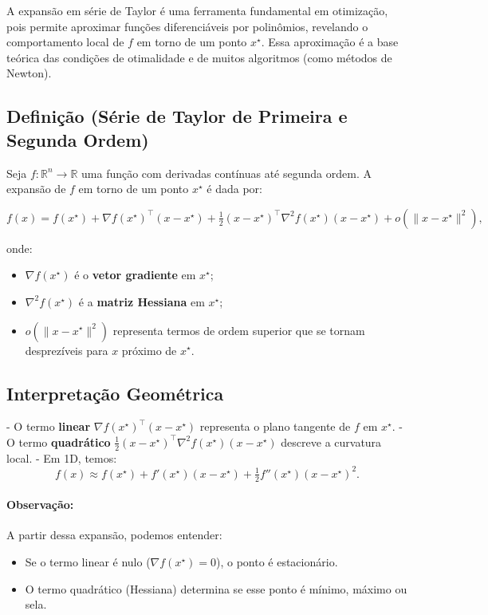 \documentclass[9pt,a4paper]{extarticle}
\begin{document}
A expansão em série de Taylor é uma ferramenta fundamental em otimização, pois permite aproximar funções diferenciáveis por polinômios, revelando o comportamento local de $f$ em torno de um ponto $x^\star$. Essa aproximação é a base teórica das condições de otimalidade e de muitos algoritmos (como métodos de Newton).

\subsection*{Definição (Série de Taylor de Primeira e Segunda Ordem)}

Seja $f:\mathbb{R}^n \to \mathbb{R}$ uma função com derivadas contínuas até segunda ordem.  
A expansão de $f$ em torno de um ponto $x^\star$ é dada por:

\[
f(x) = f(x^\star) 
+ \nabla f(x^\star)^\top (x - x^\star)
+ \tfrac{1}{2}(x - x^\star)^\top \nabla^2 f(x^\star) (x - x^\star)
+ o(\|x - x^\star\|^2),
\]

onde:
\begin{itemize}
    \item $\nabla f(x^\star)$ é o \textbf{vetor gradiente} em $x^\star$;
    \item $\nabla^2 f(x^\star)$ é a \textbf{matriz Hessiana} em $x^\star$;
    \item $o(\|x - x^\star\|^2)$ representa termos de ordem superior que se tornam desprezíveis para $x$ próximo de $x^\star$.
\end{itemize}

\subsection*{Interpretação Geométrica}

- O termo \textbf{linear} $\nabla f(x^\star)^\top (x - x^\star)$ representa o plano tangente de $f$ em $x^\star$.  
- O termo \textbf{quadrático} $\tfrac{1}{2}(x - x^\star)^\top \nabla^2 f(x^\star)(x - x^\star)$ descreve a curvatura local.  
- Em 1D, temos:
  \[
  f(x) \approx f(x^\star) + f'(x^\star)(x - x^\star) + \tfrac{1}{2}f''(x^\star)(x - x^\star)^2.
  \]

\paragraph{Observação:}
A partir dessa expansão, podemos entender:
\begin{itemize}
    \item Se o termo linear é nulo ($\nabla f(x^\star)=0$), o ponto é estacionário.
    \item O termo quadrático (Hessiana) determina se esse ponto é mínimo, máximo ou sela.
\end{itemize}
\end{document}
